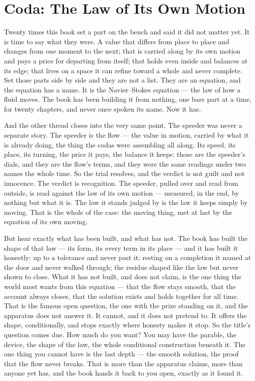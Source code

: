 \section*{Coda: The Law of Its Own Motion}

Twenty times this book set a part on the bench and said it did not matter yet. It is time to say what they were. A value that differs from place to place and changes from one moment to the next; that is carried along by its own motion and pays a price for departing from itself; that holds even inside and balances at its edge; that lives on a space it can refine toward a whole and never complete. Set those parts side by side and they are not a list. They are an equation, and the equation has a name. It is the Navier--Stokes equation --- the law of how a fluid moves. The book has been building it from nothing, one bare part at a time, for twenty chapters, and never once spoken its name. Now it has.

And the other thread closes into the very same point. The speeder was never a separate story. The speeder is the flow --- the value in motion, carried by what it is already doing, the thing the codas were assembling all along. Its speed, its place, its turning, the price it pays, the balance it keeps: those are the speeder's dials, and they are the flow's terms, and they were the same readings under two names the whole time. So the trial resolves, and the verdict is not guilt and not innocence. The verdict is recognition. The speeder, pulled over and read from outside, is read against the law of its own motion --- measured, in the end, by nothing but what it is. The law it stands judged by is the law it keeps simply by moving. That is the whole of the case: the moving thing, met at last by the equation of its own moving.

But hear exactly what has been built, and what has not. The book has built the shape of that law --- its form, its every term in its place --- and it has built it honestly: up to a tolerance and never past it; resting on a completion it named at the door and never walked through; the residue shaped like the law but never shown to close. What it has not built, and does not claim, is the one thing the world most wants from this equation --- that the flow stays smooth, that the account always closes, that the solution exists and holds together for all time. That is the famous open question, the one with the prize standing on it, and the apparatus does not answer it. It cannot, and it does not pretend to. It offers the shape, conditionally, and stops exactly where honesty makes it stop. So the title's question comes due. How much do you want? You may have the parable, the device, the shape of the law, the whole conditional construction beneath it. The one thing you cannot have is the last depth --- the smooth solution, the proof that the flow never breaks. That is more than the apparatus claims, more than anyone yet has, and the book hands it back to you open, exactly as it found it.


